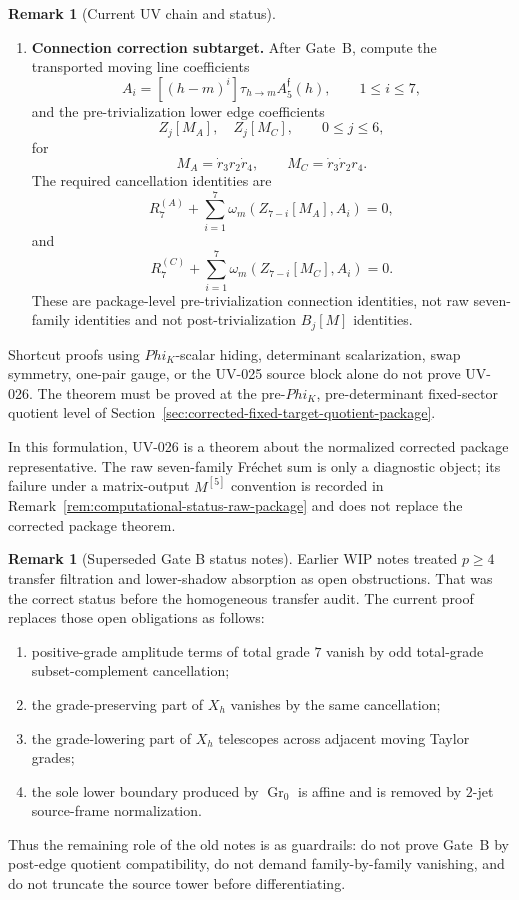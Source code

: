 \documentclass[11pt,a4paper]{amsart}
\def\Phi{Phi}%
\theoremstyle{plain}
\theoremstyle{definition}
\newtheorem{remark}[theorem]{Remark}
\begin{document}
\begin{remark}[Current UV chain and status]
\begin{enumerate}
\item \textbf{Connection correction subtarget.}
After Gate~B, compute the transported moving line coefficients
\[
A_i=[(h-m)^i]\tau_{h\to m}A_5^{\mathfrak f}(h),
\qquad
1\le i\le7,
\]
and the pre-trivialization lower edge coefficients
\[
Z_j[M_A],\quad Z_j[M_C],
\qquad
0\le j\le6,
\]
for
\[
M_A=\dot r_3r_2\dot r_4,
\qquad
M_C=\dot r_3\dot r_2r_4.
\]
The required cancellation identities are
\[
R_7^{(A)}+\sum_{i=1}^7\omega_m(Z_{7-i}[M_A],A_i)=0,
\]
and
\[
R_7^{(C)}+\sum_{i=1}^7\omega_m(Z_{7-i}[M_C],A_i)=0.
\]
These are package-level pre-trivialization connection identities, not raw
seven-family identities and not post-trivialization \(B_j[M]\) identities.
\end{enumerate}

Shortcut proofs using \(\Phi_K\)-scalar hiding, determinant scalarization,
swap symmetry, one-pair gauge, or the UV-025 source block alone do not prove
UV-026.  The theorem must be proved at the pre-\(\Phi_K\), pre-determinant
fixed-sector quotient level of
Section~\ref{sec:corrected-fixed-target-quotient-package}.

In this formulation, UV-026 is a theorem about the normalized corrected
package representative.  The raw seven-family Fr\'echet sum is only a
diagnostic object; its failure under a matrix-output \(M^{[5]}\) convention
is recorded in Remark~\ref{rem:computational-status-raw-package} and does
not replace the corrected package theorem.
\end{remark}

\begin{remark}[Superseded Gate B status notes]
\label{rem:superseded-gate-b-status-notes}
Earlier WIP notes treated \(p\ge4\) transfer filtration and lower-shadow
absorption as open obstructions.  That was the correct status before the
homogeneous transfer audit.  The current proof replaces those open
obligations as follows:
\begin{enumerate}
\item positive-grade amplitude terms of total grade \(7\) vanish by odd
total-grade subset-complement cancellation;
\item the grade-preserving part of \(X_h\) vanishes by the same
cancellation;
\item the grade-lowering part of \(X_h\) telescopes across adjacent
moving Taylor grades;
\item the sole lower boundary produced by \(\operatorname{Gr}_0\) is
affine and is removed by \(2\)-jet source-frame normalization.
\end{enumerate}
Thus the remaining role of the old notes is as guardrails: do not prove
Gate~B by post-edge quotient compatibility, do not demand
family-by-family vanishing, and do not truncate the source tower before
differentiating.
\end{remark}
\end{document}

